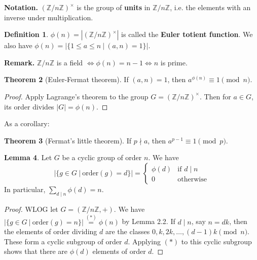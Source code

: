 \documentclass{article}
\theoremstyle{definition}
\newtheorem{theorem}{Theorem}[section]
\newtheorem{lemma}[theorem]{Lemma}
\newtheorem{defn}[theorem]{Definition}
\theoremstyle{remark}
\begin{document}
\textbf{Notation.} $(\mathbb{Z}/n\mathbb{Z})^{\times}$ is the group of \textbf{units} in $\mathbb{Z}/n\mathbb{Z}$, i.e. the elements with an inverse under multiplication.

\begin{defn}
    $\phi(n) = |(\mathbb{Z}/n\mathbb{Z})^{\times}|$ is called the \textbf{Euler totient function}. We also have $\phi(n) =|\{1 \le a \le n ~|~ (a,n) = 1\}|$. 
\end{defn}

\textbf{Remark.} $\mathbb{Z}/n\mathbb{Z}$ is a field $\iff \phi(n) = n -1 \iff n$ is prime. 

\begin{theorem}[Euler-Fermat theorem]
    If $(a,n)=1$, then $a^{\phi(n)} \equiv 1\pmod{n}$.
\end{theorem}
\begin{proof}
    Apply Lagrange's theorem to the group $G = (\mathbb{Z}/n\mathbb{Z})^{\times}$. Then for $a \in G$, its order divides $|G|= \phi(n)$.
\end{proof}
As a corollary:
\begin{theorem}[Fermat's little theorem]
    If $p \nmid a$, then $a^{p-1} \equiv 1\pmod{p}$.
\end{theorem}

\begin{lemma}%
    Let $G$ be a cyclic group of order $n$. We have \[
    |\{g \in G ~|~ \text{order}(g) = d\}| = \begin{cases}
        \phi(d) &\text{if }d \mid n \\
        0 &\text{otherwise}
    \end{cases}
    \]
    In particular, $\sum_{d \mid n}^{} \phi(d) = n$.
\end{lemma}
\begin{proof}
    WLOG let $G = (\mathbb{Z}/n\mathbb{Z}, +)$. We have $|\{g \in G ~|~ \text{order}(g) = n\}| \stackrel{(*)}{=} \phi(n)$ by Lemma 2.2. If $d \mid n$, say $n = dk$, then the elements of order dividing $d$ are the classes $0, k, 2k, \ldots, (d-1)k \pmod{n}$. These form a cyclic subgroup of order $d$. Applying $(*)$ to this cyclic subgroup shows that there are $\phi(d)$ elements of order $d$.
\end{proof}
\end{document}
